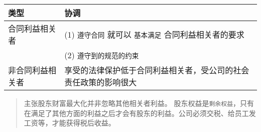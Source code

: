 \documentclass[11pt]{article}
\begin{document}
\begin{center}
\begin{tabular}{ll}
类型 & 协调\\
\hline
合同利益相关者 & (1) \texttt{遵守合同}  就可以 \texttt{基本满足} 合同利益相关者的要求\\
 & (2) \texttt{遵守到的规范的约束}\\
\hline
非合同利益相关者 & 享受的法律保护低于合同利益相关者，受公司的社会责任政策的影响很大\\
\end{tabular}
\end{center}
\begin{quote}
主张股东财富最大化并非忽略其他相关者利益。
股东权益是\texttt{剩余权益}，只有在满足了其他方面的利益之后才会有股东的利益。公司必须交税、给员工发工资等，才能获得税后收益。
\end{quote}
\end{document}
